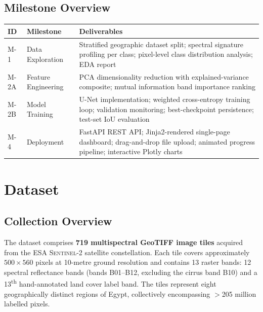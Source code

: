 \documentclass[12pt, a4paper]{article}
\newcommand{\sentinel}{\textsc{Sentinel-2}}
\begin{document}
\subsection{Milestone Overview}

\begin{center}
\renewcommand{\arraystretch}{1.3}
\begin{tabular}{p{0.9cm} p{3.5cm} p{9cm}}
\toprule
\textbf{ID} & \textbf{Milestone} & \textbf{Deliverables} \\
\midrule
M-1 & Data Exploration &
  Stratified geographic dataset split; spectral signature profiling per class;
  pixel-level class distribution analysis; EDA report \\[4pt]
M-2A & Feature Engineering &
  PCA dimensionality reduction with explained-variance composite;
  mutual information band importance ranking \\[4pt]
M-2B & Model Training &
  U-Net implementation; weighted cross-entropy training loop;
  validation monitoring; best-checkpoint persistence;
  test-set IoU evaluation \\[4pt]
M-4 & Deployment &
  FastAPI REST API; Jinja2-rendered single-page dashboard;
  drag-and-drop file upload; animated progress pipeline;
  interactive Plotly charts \\
\bottomrule
\end{tabular}
\end{center}

\section{Dataset}

\subsection{Collection Overview}

The dataset comprises \textbf{719 multispectral GeoTIFF image tiles} acquired from the ESA \sentinel{} satellite constellation. Each tile covers approximately $500 \times 560$ pixels at 10-metre ground resolution and contains 13 raster bands: 12 spectral reflectance bands (bands B01–B12, excluding the cirrus band B10) and a 13\textsuperscript{th} hand-annotated land cover label band. The tiles represent eight geographically distinct regions of Egypt, collectively encompassing $>$205 million labelled pixels.
\end{document}
